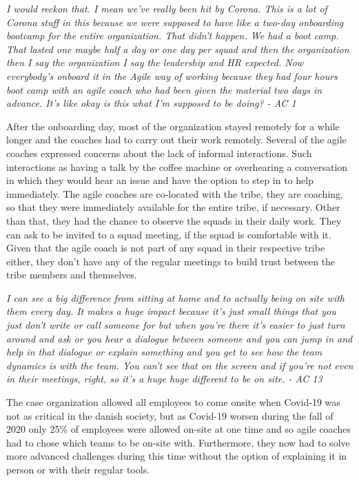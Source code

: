 \documentclass[11pt,a4paper]{report}
\begin{document}
\begin{displayquote}
\textit{
I would reckon that. I mean we've really been hit by Corona. This is a lot of Corona stuff in this because we were supposed to have like a two-day onboarding bootcamp for the entire organization. That didn't happen. We had a boot camp. That lasted one maybe half a day or one day per squad and then the organization then I say the organization I say the leadership and HR expected. Now everybody's onboard it in the Agile way of working because they had four hours boot camp with an agile coach who had been given the material two days in advance. It's like okay is this what I'm supposed to be doing? - AC 1
}
\end{displayquote}

\noindent After the onboarding day, most of the organization stayed remotely for a while longer and the coaches had to carry out their work remotely. Several of the agile coaches expressed concerns about the lack of informal interactions. Such interactions as having a talk by the coffee machine or overhearing a conversation in which they would hear an issue and have the option to step in to help immediately. The agile coaches are co-located with the tribe, they are coaching, so that they were immediately available for the entire tribe, if necessary. Other than that, they had the chance to observe the squads in their daily work. They can ask to be invited to a squad meeting, if the squad is comfortable with it. Given that the agile coach is not part of any squad in their respective tribe either, they don't have any of the regular meetings to build trust between the tribe members and themselves. 

\begin{displayquote}
\textit{
I can see a big difference from sitting at home and to actually being on site with them every day. It makes a huge impact because it's just small things that you just don't write or call someone for but when you're there it's easier to just turn around and ask or you hear a dialogue between someone and you can jump in and help in that dialogue or explain something and you get to see how the team dynamics is with the team. You can't see that on the screen and if you're not even in their meetings, right, so it's a huge huge different to be on site. - AC 13
}
\end{displayquote}

\noindent The case organization allowed all employees to come onsite when Covid-19 was not as critical in the danish society, but as Covid-19 worsen during the fall of 2020 only 25\% of employees were allowed on-site at one time and so agile coaches had to chose which teams to be on-site with. Furthermore, they now had to solve more advanced challenges during this time without the option of explaining it in person or with their regular tools.
\end{document}
